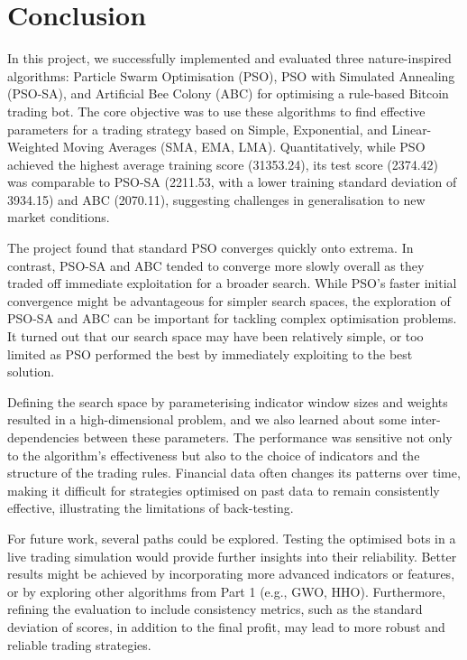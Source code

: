 \documentclass[a4paper, 12pt]{extarticle}
\begin{document}
\section{Conclusion}
In this project, we successfully implemented and evaluated three nature-inspired algorithms: Particle Swarm Optimisation (PSO), PSO with Simulated Annealing (PSO-SA), and Artificial Bee Colony (ABC) for optimising a rule-based Bitcoin trading bot. The core objective was to use these algorithms to find effective parameters for a trading strategy based on Simple, Exponential, and Linear-Weighted Moving Averages (SMA, EMA, LMA). Quantitatively, while PSO achieved the highest average training score (31353.24), its test score (2374.42) was comparable to PSO-SA (2211.53, with a lower training standard deviation of 3934.15) and ABC (2070.11), suggesting challenges in generalisation to new market conditions.

The project found that standard PSO converges quickly onto extrema. In contrast, PSO-SA and ABC tended to converge more slowly overall as they traded off immediate exploitation for a broader search. While PSO's faster initial convergence might be advantageous for simpler search spaces, the exploration of PSO-SA and ABC can be important for tackling complex optimisation problems. It turned out that our search space may have been relatively simple, or too limited as PSO performed the best by immediately exploiting to the best solution.

Defining the search space by parameterising indicator window sizes and weights resulted in a high-dimensional problem, and we also learned about some inter-dependencies between these parameters. The performance was sensitive not only to the algorithm's effectiveness but also to the choice of indicators and the structure of the trading rules. Financial data often changes its patterns over time, making it difficult for strategies optimised on past data to remain consistently effective, illustrating the limitations of back-testing.

For future work, several paths could be explored. Testing the optimised bots in a live trading simulation would provide further insights into their reliability. Better results might be achieved by incorporating more advanced indicators or features, or by exploring other algorithms from Part 1 (e.g., GWO, HHO). Furthermore, refining the evaluation to include consistency metrics, such as the standard deviation of scores, in addition to the final profit, may lead to more robust and reliable trading strategies. 
\end{document}
